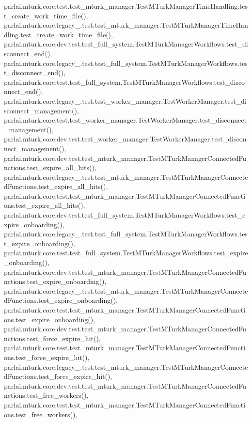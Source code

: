 parlai.\+mturk.\+core.\+test.\+test\+\_\+mturk\+\_\+manager.\+Test\+M\+Turk\+Manager\+Time\+Handling.\+test\+\_\+create\+\_\+work\+\_\+time\+\_\+file(), parlai.\+mturk.\+core.\+legacy\+\_.\+test.\+test\+\_\+mturk\+\_\+manager.\+Test\+M\+Turk\+Manager\+Time\+Handling.\+test\+\_\+create\+\_\+work\+\_\+time\+\_\+file(), parlai.\+mturk.\+core.\+dev.\+test.\+test\+\_\+full\+\_\+system.\+Test\+M\+Turk\+Manager\+Workflows.\+test\+\_\+disconnect\+\_\+end(), parlai.\+mturk.\+core.\+legacy\+\_.\+test.\+test\+\_\+full\+\_\+system.\+Test\+M\+Turk\+Manager\+Workflows.\+test\+\_\+disconnect\+\_\+end(), parlai.\+mturk.\+core.\+test.\+test\+\_\+full\+\_\+system.\+Test\+M\+Turk\+Manager\+Workflows.\+test\+\_\+disconnect\+\_\+end(), parlai.\+mturk.\+core.\+legacy\+\_.\+test.\+test\+\_\+worker\+\_\+manager.\+Test\+Worker\+Manager.\+test\+\_\+disconnect\+\_\+management(), parlai.\+mturk.\+core.\+test.\+test\+\_\+worker\+\_\+manager.\+Test\+Worker\+Manager.\+test\+\_\+disconnect\+\_\+management(), parlai.\+mturk.\+core.\+dev.\+test.\+test\+\_\+worker\+\_\+manager.\+Test\+Worker\+Manager.\+test\+\_\+disconnect\+\_\+management(), parlai.\+mturk.\+core.\+dev.\+test.\+test\+\_\+mturk\+\_\+manager.\+Test\+M\+Turk\+Manager\+Connected\+Functions.\+test\+\_\+expire\+\_\+all\+\_\+hits(), parlai.\+mturk.\+core.\+legacy\+\_.\+test.\+test\+\_\+mturk\+\_\+manager.\+Test\+M\+Turk\+Manager\+Connected\+Functions.\+test\+\_\+expire\+\_\+all\+\_\+hits(), parlai.\+mturk.\+core.\+test.\+test\+\_\+mturk\+\_\+manager.\+Test\+M\+Turk\+Manager\+Connected\+Functions.\+test\+\_\+expire\+\_\+all\+\_\+hits(), parlai.\+mturk.\+core.\+dev.\+test.\+test\+\_\+full\+\_\+system.\+Test\+M\+Turk\+Manager\+Workflows.\+test\+\_\+expire\+\_\+onboarding(), parlai.\+mturk.\+core.\+legacy\+\_.\+test.\+test\+\_\+full\+\_\+system.\+Test\+M\+Turk\+Manager\+Workflows.\+test\+\_\+expire\+\_\+onboarding(), parlai.\+mturk.\+core.\+test.\+test\+\_\+full\+\_\+system.\+Test\+M\+Turk\+Manager\+Workflows.\+test\+\_\+expire\+\_\+onboarding(), parlai.\+mturk.\+core.\+dev.\+test.\+test\+\_\+mturk\+\_\+manager.\+Test\+M\+Turk\+Manager\+Connected\+Functions.\+test\+\_\+expire\+\_\+onboarding(), parlai.\+mturk.\+core.\+legacy\+\_.\+test.\+test\+\_\+mturk\+\_\+manager.\+Test\+M\+Turk\+Manager\+Connected\+Functions.\+test\+\_\+expire\+\_\+onboarding(), parlai.\+mturk.\+core.\+test.\+test\+\_\+mturk\+\_\+manager.\+Test\+M\+Turk\+Manager\+Connected\+Functions.\+test\+\_\+expire\+\_\+onboarding(), parlai.\+mturk.\+core.\+dev.\+test.\+test\+\_\+mturk\+\_\+manager.\+Test\+M\+Turk\+Manager\+Connected\+Functions.\+test\+\_\+force\+\_\+expire\+\_\+hit(), parlai.\+mturk.\+core.\+test.\+test\+\_\+mturk\+\_\+manager.\+Test\+M\+Turk\+Manager\+Connected\+Functions.\+test\+\_\+force\+\_\+expire\+\_\+hit(), parlai.\+mturk.\+core.\+legacy\+\_.\+test.\+test\+\_\+mturk\+\_\+manager.\+Test\+M\+Turk\+Manager\+Connected\+Functions.\+test\+\_\+force\+\_\+expire\+\_\+hit(), parlai.\+mturk.\+core.\+dev.\+test.\+test\+\_\+mturk\+\_\+manager.\+Test\+M\+Turk\+Manager\+Connected\+Functions.\+test\+\_\+free\+\_\+workers(), parlai.\+mturk.\+core.\+test.\+test\+\_\+mturk\+\_\+manager.\+Test\+M\+Turk\+Manager\+Connected\+Functions.\+test\+\_\+free\+\_\+workers(), 